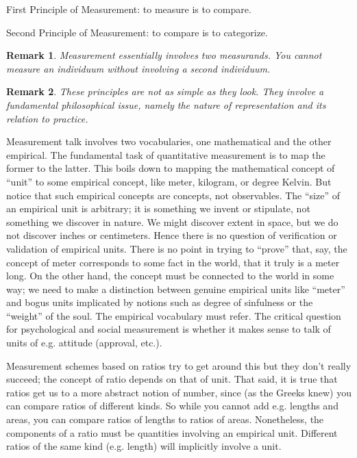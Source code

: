 \documentclass[11pt,twoside]{article}
\newtheorem{remark}{Remark}
\begin{document}
First Principle of Measurement: to measure is to compare.

Second Principle of Measurement:  to compare is to categorize.

\begin{remark}
  Measurement essentially involves two measurands.  You cannot measure
  an individuum without involving a second individuum.
\end{remark}

\begin{remark}
  These principles are not as simple as they look.  They involve a
  fundamental philosophical issue, namely the nature of representation
  and its relation to practice.
\end{remark}

Measurement talk involves two vocabularies, one mathematical and the
other empirical.  The fundamental task of quantitative measurement is
to map the former to the latter.  This boils down to mapping the
mathematical concept of ``unit'' to some empirical concept, like
meter, kilogram, or degree Kelvin.  But notice that such empirical
concepts are concepts, not observables.  The ``size'' of an empirical
unit is arbitrary; it is something we invent or stipulate, not
something we discover in nature.  We might discover extent in space,
but we do not discover inches or centimeters.  Hence there is no
question of verification or validation of empirical units.  There is
no point in trying to ``prove'' that, say, the concept of meter
corresponds to some fact in the world, that it truly is a meter long.
On the other hand, the concept must be connected to the world in some
way; we need to make a distinction between genuine empirical units
like ``meter'' and bogus units implicated by notions such as degree of
sinfulness or the ``weight'' of the soul.  The empirical vocabulary
must refer.  The critical question for psychological and social
measurement is whether it makes sense to talk of units of
e.g. attitude (approval, etc.).

Measurement schemes based on ratios try to get around this but they
don't really succeed; the concept of ratio depends on that of unit.
That said, it is true that ratios get us to a more abstract notion of
number, since (as the Greeks knew) you can compare ratios of different
kinds.  So while you cannot add e.g. lengths and areas, you can
compare ratios of lengths to ratios of areas.  Nonetheless, the
components of a ratio must be quantities involving an empirical unit.
Different ratios of the same kind (e.g. length) will implicitly
involve a unit.
\end{document}
